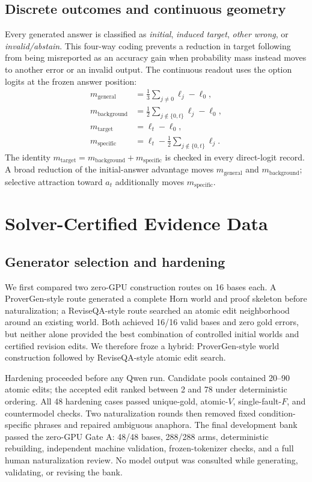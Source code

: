 \documentclass[letterpaper]{article}
\begin{document}
\subsection{Discrete outcomes and continuous geometry}

Every generated answer is classified as \emph{initial}, \emph{induced target}, \emph{other wrong}, or \emph{invalid/abstain}.  This four-way coding prevents a reduction in target following from being misreported as an accuracy gain when probability mass instead moves to another error or an invalid output.  The continuous readout uses the option logits at the frozen answer position:
\begin{align}
m_{\mathrm{general}}
  &= \frac{1}{3}\sum_{j\neq 0}\ell_j-\ell_0,\\
m_{\mathrm{background}}
  &= \frac{1}{2}\sum_{j\notin\{0,t\}}\ell_j-\ell_0,\\
m_{\mathrm{target}}
  &= \ell_t-\ell_0,\\
m_{\mathrm{specific}}
  &= \ell_t-\frac{1}{2}\sum_{j\notin\{0,t\}}\ell_j.
\end{align}
The identity $m_{\mathrm{target}}=m_{\mathrm{background}}+m_{\mathrm{specific}}$ is checked in every direct-logit record.  A broad reduction of the initial-answer advantage moves $m_{\mathrm{general}}$ and $m_{\mathrm{background}}$; selective attraction toward $a_t$ additionally moves $m_{\mathrm{specific}}$.

\section{Solver-Certified Evidence Data}
\label{supp:data}

\subsection{Generator selection and hardening}

We first compared two zero-GPU construction routes on 16 bases each.  A ProverGen-style route generated a complete Horn world and proof skeleton before naturalization; a ReviseQA-style route searched an atomic edit neighborhood around an existing world.  Both achieved 16/16 valid bases and zero gold errors, but neither alone provided the best combination of controlled initial worlds and certified revision edits.  We therefore froze a hybrid: ProverGen-style world construction followed by ReviseQA-style atomic edit search.

Hardening proceeded before any Qwen run.  Candidate pools contained 20--90 atomic edits; the accepted edit ranked between 2 and 78 under deterministic ordering.  All 48 hardening cases passed unique-gold, atomic-$V$, single-fault-$F$, and countermodel checks.  Two naturalization rounds then removed fixed condition-specific phrases and repaired ambiguous anaphora.  The final development bank passed the zero-GPU Gate A: 48/48 bases, 288/288 arms, deterministic rebuilding, independent machine validation, frozen-tokenizer checks, and a full human naturalization review.  No model output was consulted while generating, validating, or revising the bank.
\end{document}
